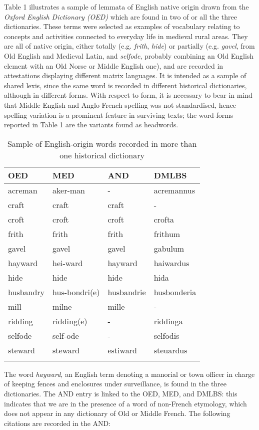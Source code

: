 \documentclass[output=paper,colorlinks,citecolor=brown,arabicfont,chinesefont]{langscibook}
\begin{document}
Table 1 illustrates a sample of lemmata of English native origin drawn from the \emph{Oxford English Dictionary (OED)} which are found in two of or all the three dictionaries. These terms were selected as examples of vocabulary relating to concepts and activities connected to everyday life in medieval rural areas. They are all of native origin, either totally (e.g. \emph{frith}, \emph{hide}) or partially (e.g. \emph{gavel}, from Old English and Medieval Latin, and \emph{selfode}, probably combining an Old English element with an Old Norse or Middle English one), and are recorded in attestations displaying different matrix languages. It is intended as a sample of shared lexis, since the same word is recorded in different historical dictionaries, although in different forms. With respect to form, it is necessary to bear in mind that Middle English and Anglo-French spelling was not standardised, hence spelling variation is a prominent feature in surviving texts; the word-forms reported in Table 1 are the variants found as headwords.

\begin{table}
\caption {Sample of English-origin words recorded in more than one historical dictionary}
\label{tab:myname:frequencies}
\begin{tabular}{llll}
\lsptoprule
OED & MED & AND & DMLBS\\
\midrule
acreman & aker-man & - & acremannus \\
craft & craft & craft & - \\
croft & croft & croft & crofta \\
frith & frith & frith & frithum \\
gavel & gavel & gavel & gabulum \\
hayward & hei-ward & hayward & haiwardus \\
hide & hide & hide & hida \\
husbandry & hus-bondri(e) & husbandrie & husbonderia \\
mill & milne & mille & - \\
ridding & ridding(e)  & - & riddinga  \\
selfode & self-ode & - & selfodis  \\
steward & steward & estiward & steuardus  \\
\lspbottomrule
\end{tabular}
\end{table}

The word \emph{hayward}, an English term denoting a manorial or town officer in charge of keeping fences and enclosures under surveillance, is found in the three dictionaries. The AND entry is linked to the OED, MED, and DMLBS: this indicates that we are in the presence of a word of non-French etymology, which does not appear in any dictionary of Old or Middle French. The following citations are recorded in the AND:
\end{document}

